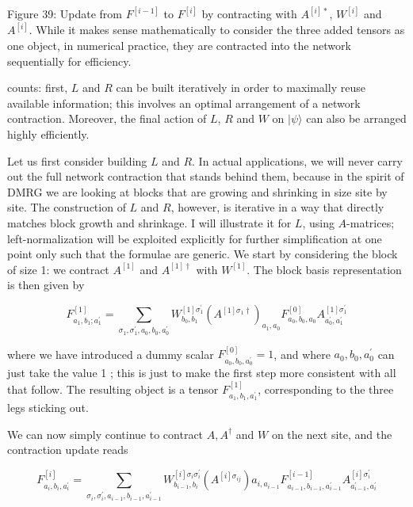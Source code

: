 \documentclass[12pt]{article}
\begin{document}
Figure 39: Update from $F^{[i-1]}$ to $F^{[i]}$ by contracting with $A^{[i] *}$, $W^{[i]}$ and $A^{[i]}$. While it makes sense mathematically to consider the three added tensors as one object, in numerical practice, they are contracted into the network sequentially for efficiency.

counts: first, $L$ and $R$ can be built iteratively in order to maximally reuse available information; this involves an optimal arrangement of a network contraction. Moreover, the final action of $L$, $R$ and $W$ on $|\psi\rangle$ can also be arranged highly efficiently.

Let us first consider building $L$ and $R$. In actual applications, we will never carry out the full network contraction that stands behind them, because in the spirit of DMRG we are looking at blocks that are growing and shrinking in size site by site. The construction of $L$ and $R$, however, is iterative in a way that directly matches block growth and shrinkage. I will illustrate it for $L$, using $A$-matrices; left-normalization will be exploited explicitly for further simplification at one point only such that the formulae are generic. We start by considering the block of size 1: we contract $A^{[1]}$ and $A^{[1] \dagger}$ with $W^{[1]}$. The block basis representation is then given by


\begin{equation*}
F_{a_{1}, b_{1} ; a_{1}^{\prime}}^{[1]}=\sum_{\sigma_{1}, \sigma_{1}^{\prime}, a_{0}, b_{0}, a_{0}^{\prime}} W_{b_{0}, b_{1}}^{[1] \sigma_{1}^{\prime}}\left(A^{[1] \sigma_{1} \dagger}\right)_{a_{1}, a_{0}} F_{a_{0}, b_{0}, a_{0}}^{[0]} A_{a_{0}^{\prime}, a_{1}^{\prime}}^{[1] \sigma_{1}^{\prime}} \tag{195}
\end{equation*}


where we have introduced a dummy scalar $F_{a_{0}, b_{0}, a_{0}^{\prime}}^{[0]}=1$, and where $a_{0}, b_{0}, a_{0}^{\prime}$ can just take the value 1 ; this is just to make the first step more consistent with all that follow. The resulting object is a tensor $F_{a_{1}, b_{1}, a_{1}^{\prime}}^{[1]}$, corresponding to the three legs sticking out.

We can now simply continue to contract $A, A^{\dagger}$ and $W$ on the next site, and the contraction update reads


\begin{equation*}
F_{a_{i}, b_{i}, a_{i}^{\prime}}^{[i]}=\sum_{\sigma_{i}, \sigma_{i}^{\prime}, a_{i-1}, b_{i-1}, a_{i-1}^{\prime}} W_{b_{i-1}, b_{i}}^{[i] \sigma_{i} \sigma_{i}^{\prime}}\left(A^{[i] \sigma_{i j}}\right) a_{i, a_{i-1}} F_{a_{i-1}, b_{i-1}, a_{i-1}^{\prime}}^{[i-1]} A_{a_{i-1}^{\prime}, a_{i}^{\prime}}^{[i] \sigma_{i}^{\prime}} \tag{196}
\end{equation*}
\end{document}
